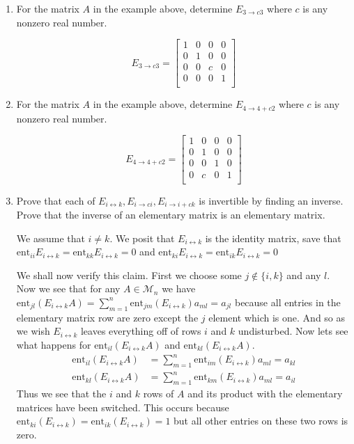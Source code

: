 \documentclass[letterpaper]{article}
\begin{document}
\begin{enumerate}
\item
For the matrix $A$ in the example above, determine $E_{3\to c3}$ where $c$ is any nonzero real number.

\[E_{3\to c3}=\left[\begin{array}{cccc}1&0&0&0\\0&1&0&0\\0&0&c&0\\0&0&0&1\\\end{array}\right]\]

\item
For the matrix $A$ in the example above, determine $E_{4\to4+c2}$ where $c$ is any nonzero real number.

\[E_{4\to 4+c2}=\left[\begin{array}{cccc}1&0&0&0\\0&1&0&0\\0&0&1&0\\0&c&0&1\\\end{array}\right]\]

\item
Prove that each of $E_{i\leftrightarrow k},E_{i\to ci}, E_{i\to i+ck}$ is invertible by finding an inverse. Prove that the inverse of an elementary matrix is an elementary matrix. 

We assume that $i\ne k$.
We posit that $E_{i\leftrightarrow k}$ is the identity matrix, save that $\text{ent}_{ii}E_{i\leftrightarrow k}=\text{ent}_{kk}E_{i\leftrightarrow k}=0$ and $\text{ent}_{ki}E_{i\leftrightarrow k}=\text{ent}_{ik}E_{i\leftrightarrow k}=0$

We shall now verify this claim.
First we choose some $j\not\in\{i,k\}$ and any $l$.
Now we see that for any $A\in \mathcal{M}_n$ we have $\text{ent}_{jl}(E_{i\leftrightarrow k}A)=\sum\limits_{m=1}^n{\text{ent}_{jm}(E_{i\leftrightarrow k})a_{ml}}=a_{jl}$ because all entries in the elementary matrix row are zero except the $j$ element which is one.
And so as we wish $E_{i\leftrightarrow k}$ leaves everything off of rows $i$ and $k$ undisturbed.
Now lets see what happens for $\text{ent}_{il}(E_{i\leftrightarrow k}A)$ and $\text{ent}_{kl}(E_{i\leftrightarrow k}A)$.
\begin{align*}
  \text{ent}_{il}(E_{i\leftrightarrow k}A)
  &=\sum\limits_{m=1}^n{\text{ent}_{im}(E_{i\leftrightarrow k})a_{ml}}=a_{kl}\\
  \text{ent}_{kl}(E_{i\leftrightarrow k}A)
  &=\sum\limits_{m=1}^n{\text{ent}_{km}(E_{i\leftrightarrow k})a_{ml}}=a_{il}
\end{align*}
Thus we see that the $i$ and $k$ rows of $A$ and its product with the elementary matrices have been switched. This occurs because $\text{ent}_{ki}(E_{i\leftrightarrow k})=\text{ent}_{ik}(E_{i\leftrightarrow k})=1$ but all other entries on these two rows is zero.


\end{enumerate}
\end{document}
